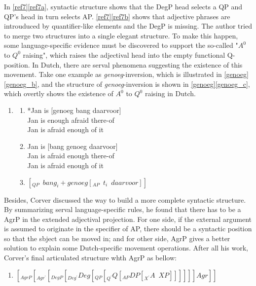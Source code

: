 \documentclass{ctexart}
\begin{document}
In \ref{ref7}\ref{ref7a}, syntactic structure shows that the DegP head selects a QP and QP's head in turn selects AP. \ref{ref7}\ref{ref7b} shows that adjective phrases are introuduced by quantifier-like elements and the DegP is missing. The author tried to merge two structures into a single elegant structure. To make this happen, some language-specific evidence must be discovered to support the so-called "$A^0$ to $Q^0$ raising", which raises the adjectival head into the empty functional Q-position. In Dutch, there are serval phenomena suggesting the existence of this movement. Take one example as \textit{genoeg}-inversion, which is illustrated in \ref{genoeg}\ref{genoeg_b}, and the structure of \textit{genoeg}-inversion is shown in \ref{genoeg}\ref{genoeg_c}, which overtly shows the existence of $A^0$ to $Q^0$ raising in Dutch.

\begin{enumerate}[resume]
\item \label{genoeg}
\begin{enumerate}

\item 
*Jan is [genoeg bang daarvoor] \\
Jan is enough afraid there-of \\
Jan is afraid enough of it

\item \label{genoeg_b} 
Jan is [bang genoeg daarvoor] \\
Jan is afraid enough there-of \\
Jan is afraid enough of it

\item \label{genoeg_c} $[_{QP} \enspace bang_i + genoeg[_{AP} \enspace t_i \enspace daarvoor]]$

\end{enumerate} 
\end{enumerate} 

Besides, Corver discussed the way to build a more complete syntactic structure. By summarizing serval language-specific rules, he found that there has to be a AgrP in the extended adjectival projection. For one side, if the external argument is assumed to originate in the specifier of AP, there should be a syntactic position so that the sbject can be moved in; and for other side, AgrP gives a better solution to explain some Dutch-specific movement operations. After all his work, Corver's final articulated structure whth AgrP as bellow:

\begin{enumerate}[resume]
\item

$[_{AgrP}[_{Agr^{\prime}}[_{DegP}[_{Deg^{\prime}}Deg[_{QP}[_{Q^{\prime}} Q [_{AP}DP[_{X^{\prime}}A \enspace XP]]]]]]Agr]]$
    
\end{enumerate}
\end{document}
